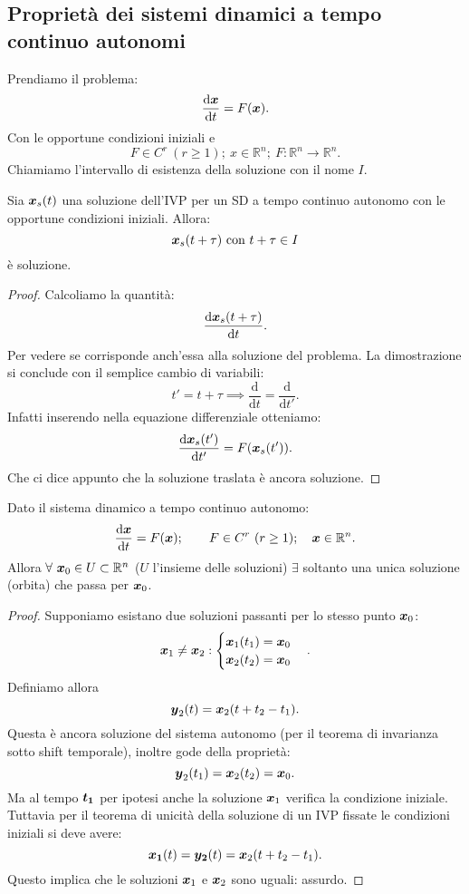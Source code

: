 \subsection{Proprietà dei sistemi dinamici a tempo continuo autonomi}%
\label{sub:Proprietà dei sistemi dinamici a tempo continuo autonomi}
Prendiamo il problema:
\[
	\frac{\text{d} \boldsymbol{x}}{\text{d} t} = F(\boldsymbol{x})
.\] 
Con le opportune condizioni iniziali e
\[
    F \in C^r \ (r\ge 1); \ x \in \mathbb{R}^n; \ F:\mathbb{R}^n\to \mathbb{R}^n
.\] 
Chiamiamo l'intervallo di esistenza della soluzione con il nome $I$.
\begin{thm}
    Sia $\boldsymbol{x}_s(t)$ una soluzione dell'IVP per un SD a tempo continuo autonomo con le opportune condizioni iniziali. Allora: 
    \[
	\boldsymbol{x}_s(t+\tau) \text{ con } t + \tau  \in I 
    \] 
    è soluzione.
\end{thm}
\noindent
\begin{proof}
    Calcoliamo la quantità:
    \[
	\frac{\text{d} \boldsymbol{x}_s(t+\tau)}{\text{d} t} 
    .\] 
    Per vedere se corrisponde anch'essa alla soluzione del problema. La dimostrazione si conclude con il semplice cambio di variabili:
    \[
        t' = t + \tau  \implies  \frac{\text{d} }{\text{d} t} = \frac{\text{d} }{\text{d} t'} 
    .\] 
    Infatti inserendo nella equazione differenziale otteniamo:
    \[
	\frac{\text{d} \boldsymbol{x}_s(t')}{\text{d} t'} = F(\boldsymbol{x}_s(t'))
    .\] 
    Che ci dice appunto che la soluzione traslata è ancora soluzione.
\end{proof}
\begin{thm}
    Dato il sistema dinamico a tempo continuo autonomo:
    \[
	\frac{\text{d} \boldsymbol{x}}{\text{d} t} = F(\boldsymbol{x}); \qquad F \in C^r \ (r\ge 1); \quad \boldsymbol{x}\in\mathbb{R}^n
    .\] 
    Allora $\forall \ \boldsymbol{x}_0 \in U \subset \mathbb{R}^n$ ($U$ l'insieme delle soluzioni) $\exists$ soltanto una unica soluzione (orbita) che passa per $\boldsymbol{x}_0$.
\end{thm}
\begin{proof}
    Supponiamo esistano due soluzioni passanti per lo stesso punto $\boldsymbol{x}_0$:
    \[
        \boldsymbol{x}_1 \neq \boldsymbol{x}_2: 
	\begin{cases}
	    \boldsymbol{x}_1(t_1)=\boldsymbol{x}_0\\
	    \boldsymbol{x}_2(t_2)=\boldsymbol{x}_0
	\end{cases}
    .\] 
    Definiamo allora 
    \[
	\boldsymbol{y}_2(t)=\boldsymbol{x}_2(t+t_2-t_1)
    .\] 
    Questa è ancora soluzione del sistema autonomo (per il teorema di invarianza sotto shift temporale), inoltre gode della proprietà:
    \[
	\boldsymbol{y}_2(t_1)=\boldsymbol{x}_2(t_2)=\boldsymbol{x}_0
    .\] 
    Ma al tempo $\boldsymbol{t_1}$ per ipotesi anche la soluzione $\boldsymbol{x}_1$ verifica la condizione iniziale.\\
    Tuttavia per il teorema di unicità della soluzione di un IVP fissate le condizioni iniziali si deve avere:
    \[
	\boldsymbol{x_1} (t)=\boldsymbol{y_2} (t) = \boldsymbol{x}_2(t+t_2-t_1)
    .\] 
    Questo implica che le soluzioni $\boldsymbol{x}_1$ e $\boldsymbol{x}_2$ sono uguali: assurdo.
\end{proof}
\noindent

